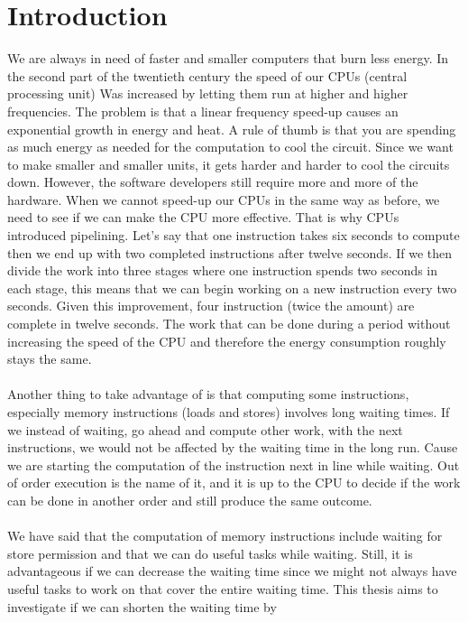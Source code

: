 \chapter{Introduction}
\label{chap:In}
We are always in need of faster and smaller computers that burn less energy. In
the second part of the twentieth century the speed of our CPUs (central processing unit)
Was increased by letting them run at higher and higher frequencies. The problem is that a linear
frequency speed-up causes an exponential growth in energy and heat. A rule of thumb
is that you are spending as much energy as needed for the computation to cool the
circuit. Since we want to make smaller and smaller units, it gets harder and harder
to cool the circuits down. However, the software developers still
require more and more of the hardware. When we cannot speed-up our CPUs
in the same way as before, we need to see if we can make the CPU more effective. That is why
CPUs introduced pipelining. Let's say that one instruction takes six seconds to compute
then we end up with two completed instructions after twelve seconds. If we then divide
the work into three stages where one instruction spends two seconds in each stage, this means
that we can begin working on a new instruction every two seconds. Given this improvement, four
instruction (twice the amount) are complete in twelve seconds. The work that can be done during a period without increasing the speed
of the CPU and therefore the energy consumption roughly stays the same.
\\ \\
Another thing to take advantage of is that computing some instructions, especially
memory instructions (loads and stores) involves long waiting times. If we instead of waiting, go ahead and compute other work, with the next instructions,
we would not be affected by the waiting time in the long run. Cause we are starting
the computation of the instruction next in line while waiting. Out of
order execution is the name of it, and it is up to the CPU to decide if the work can be done in another
order and still produce the same outcome.
\\ \\
We have said that the computation of memory instructions include waiting for store permission
and that we can do useful tasks while waiting. Still, it is advantageous if we can decrease the
waiting time since we might not always have useful tasks to work on that cover the
entire waiting time. This thesis aims to investigate if we can shorten the waiting time by
